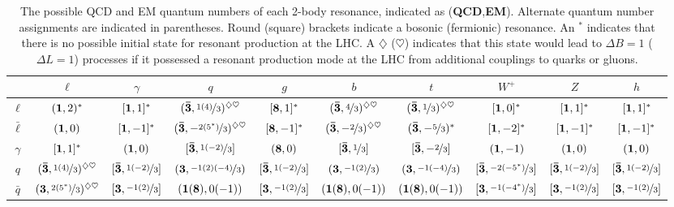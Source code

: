 \begin{table}
\caption{The possible QCD and EM quantum numbers of each 2-body resonance, indicated as ({\bf QCD},{\bf EM}). Alternate quantum number assignments are indicated in parentheses. Round (square) brackets indicate a bosonic (fermionic) resonance. An ${}^*$ indicates that there is no possible initial state for resonant production at the LHC. A $\diamondsuit$ ($\heartsuit$) indicates that this state would lead to $\Delta B=1$ ($\Delta L=1$) processes if it possessed a resonant production mode at the LHC from additional couplings to quarks or gluons. \label{tab:quantumnumbers}}
\begin{center}
\begin{tabular}{cccccccccc} \hline\hline
& $\ell$ & $\gamma$ & $q$ & $g$ & $b$ & $t$ & $W^+$ & $Z$ & $h$ \\ \hline
$\ell$ & $(\mathbf{1}, 2)^*$ & $[\mathbf{1}, 1]^*$ & $(\mathbf{\bar 3}, \nicefrac{1(4)}{3})^{\diamondsuit\heartsuit}$& $[\mathbf{8}, 1]^*$& $(\mathbf{\bar 3}, \nicefrac{4}{3})^{\diamondsuit\heartsuit}$& $(\mathbf{\bar 3}, \nicefrac{1}{3})^{\diamondsuit\heartsuit}$& $[\mathbf{1}, 0]^*$& $[\mathbf{1}, 1]^*$ &$[\mathbf{1}, 1]^*$  \\  
$\bar \ell$ & $(\mathbf{1}, 0)$ & $[\mathbf{1}, -1]^*$ & $(\mathbf{\bar 3}, -\nicefrac{2(5^*)}{3})^{\diamondsuit\heartsuit}$& $[\mathbf{8}, -1]^*$& $(\mathbf{\bar 3}, -\nicefrac{2}{3})^{\diamondsuit\heartsuit}$& $(\mathbf{\bar 3}, -\nicefrac{5}{3})^*$& $[\mathbf{1}, -2]^*$ & $[\mathbf{1}, -1]^*$& $[\mathbf{1}, -1]^*$   \\ 
$\gamma$ & $[\mathbf{1}, 1]^*$ & $(\mathbf{1}, 0)$ & $[\mathbf{\bar 3}, \nicefrac{1(-2)}{3}]$ & $(\mathbf{8}, 0)$& $[\mathbf{\bar 3}, \nicefrac{1}{3}]$& $[\mathbf{\bar 3}, -\nicefrac{2}{3}]$ & $(\mathbf{1}, -1)$ & $(\mathbf{1}, 0)$ &  $(\mathbf{1}, 0)$ \\ 
$ q$ & $(\mathbf{\bar 3}, \nicefrac{1(4)}{3})^{\diamondsuit\heartsuit}$ & $[\mathbf{\bar 3}, \nicefrac{1(-2)}{3}]$ & $(\mathbf{3}, \nicefrac{-1(2)(-4)}{3})$ & $[\mathbf{\bar 3}, \nicefrac{1(-2)}{3}]$ & $(\mathbf{3}, \nicefrac{-1(2)}{3})$ & $(\mathbf{3}, \nicefrac{-1(-4)}{3})$ &  $[\mathbf{\bar 3}, \nicefrac{-2(-5^{*})}{3}]$&  $[\mathbf{\bar 3}, \nicefrac{1(-2)}{3}]$ &  $[\mathbf{\bar 3}, \nicefrac{1(-2)}{3}]$ \\ 
$ \bar q $ & $(\mathbf{3}, \nicefrac{2(5^*)}{3})^{\diamondsuit\heartsuit}$ & $[\mathbf{3}, \nicefrac{-1(2)}{3}]$& $(\mathbf{1(8)}, 0(-1))$ & $[\mathbf{3}, \nicefrac{-1(2)}{3}]$ & $(\mathbf{1(8)}, 0(-1))$ & $(\mathbf{1(8)}, 0(-1))$  & $[\mathbf{3}, \nicefrac{-1(-4^*)}{3}]$ & $[\mathbf{3}, \nicefrac{-1(2)}{3}]$ & $[\mathbf{3}, \nicefrac{-1(2)}{3}]$  \\ 

\end{tabular}
\end{center}
\end{table}
